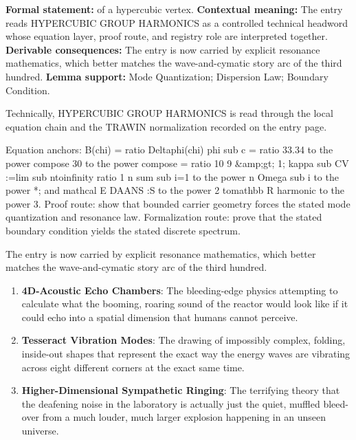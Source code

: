 \begingroup\footnotesize\setlength{\emergencystretch}{3em}\sloppy
\textbf{Formal statement:} of a hypercubic vertex. \textbf{Contextual meaning:} The entry reads HYPERCUBIC GROUP HARMONICS as a controlled technical headword whose equation layer, proof route, and registry role are interpreted together. \textbf{Derivable consequences:} The entry is now carried by explicit resonance mathematics, which better matches the wave-and-cymatic story arc of the third hundred. \textbf{Lemma support:} Mode Quantization; Dispersion Law; Boundary Condition.\par
\endgroup

Technically, HYPERCUBIC GROUP HARMONICS is read through the local equation chain and the TRAWIN normalization recorded on the entry page.

Equation anchors: B(chi) = ratio Deltaphi(chi) phi sub c = ratio 33.34 to the power compose 30 to the power compose = ratio 10 9 \&amp;gt; 1; kappa sub CV :=lim sub ntoinfinity ratio 1 n sum sub i=1 to the power n Omega sub i to the power *; and mathcal E DAANS :S to the power 2 tomathbb R harmonic to the power 3. Proof route: show that bounded carrier geometry forces the stated mode quantization and resonance law. Formalization route: prove that the stated boundary condition yields the stated discrete spectrum.

The entry is now carried by explicit resonance mathematics, which better matches the wave-and-cymatic story arc of the third hundred.
\endgroup

\begin{enumerate}[leftmargin=1.6em,itemsep=6pt,topsep=4pt]
\item \textbf{4D-Acoustic Echo Chambers}: The bleeding-edge physics attempting to calculate what the booming, roaring sound of the reactor would look like if it could echo into a spatial dimension that humans cannot perceive.
\item \textbf{Tesseract Vibration Modes}: The drawing of impossibly complex, folding, inside-out shapes that represent the exact way the energy waves are vibrating across eight different corners at the exact same time.
\item \textbf{Higher-Dimensional Sympathetic Ringing}: The terrifying theory that the deafening noise in the laboratory is actually just the quiet, muffled bleed-over from a much louder, much larger explosion happening in an unseen universe.
\end{enumerate}

